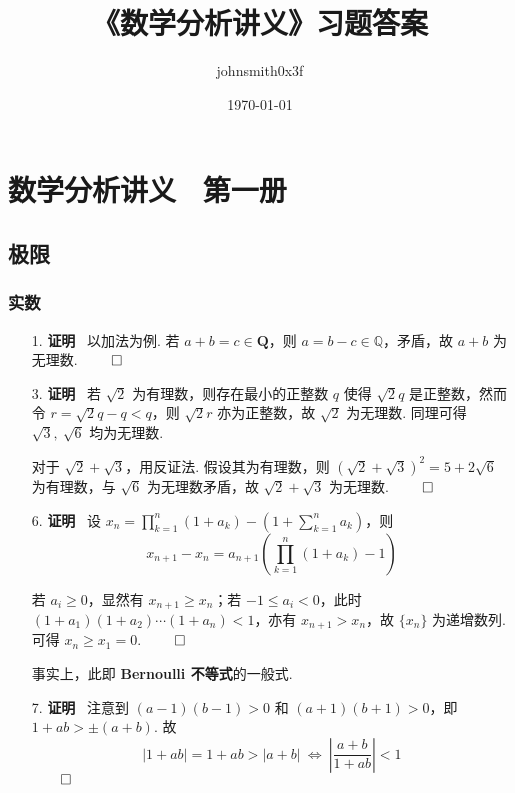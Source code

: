\documentclass[11pt,oneside,fontset=fandol]{ctexbook} %
\title{《数学分析讲义》习题答案}
\author{johnsmith0x3f}
\date{\today} %
\begin{document}
\maketitle

\newpage

\frontmatter

\tableofcontents

\newpage

\mainmatter

\part*{数学分析讲义 \ 第一册}

\thispagestyle{empty}

\newpage

\chapter{极限}

\section{实数}

\begin{enumerate}
    \item[1.]
    \textbf{证明} \ 以加法为例. 若 $a + b = c \in \mathbf Q$，则 $a = b - c \in \mathbb Q$，矛盾，故 $a + b$ 为无理数.
    $\hfill\qed$
    \item[3.]
    \textbf{证明} \ 若 $\sqrt 2$ 为有理数，则存在最小的正整数 $q$ 使得 $\sqrt 2 q$ 是正整数，然而令 $r = \sqrt 2 q - q < q$，则 $\sqrt 2 r$ 亦为正整数，故 $\sqrt 2$ 为无理数. 同理可得 $\sqrt 3,\ \sqrt 6$ 均为无理数.
    
    对于 $\sqrt 2 + \sqrt 3$，用反证法. 假设其为有理数，则 $(\sqrt 2 + \sqrt 3)^2 = 5 + 2 \sqrt 6$ 为有理数，与 $\sqrt 6$ 为无理数矛盾，故 $\sqrt 2 + \sqrt 3$ 为无理数.
    $\hfill\qed$
    \item[6.]
    \textbf{证明} \ 设 $x_n = \prod_{k=1}^n (1 + a_k) - (1 + \sum_{k=1}^n a_k)$，则
    \[
        x_{n+1} - x_n = a_{n+1} \left( \prod_{k=1}^n (1 + a_k) - 1 \right)
    \]
    
    若 $a_i \geqslant 0$，显然有 $x_{n+1} \geqslant x_n$；若 $-1 \leqslant a_i < 0$，此时 $(1+a_1)(1+a_2)\cdots(1+a_n) < 1$，亦有 $x_{n+1} > x_n$，故 $\{ x_n \}$ 为递增数列. 可得 $x_n \geqslant x_1 = 0$.
    $\hfill\qed$

    事实上，此即 \textbf{Bernoulli 不等式}的一般式.
    \item[7.]
    \textbf{证明} \ 注意到 $(a-1)(b-1) > 0$ 和 $(a+1)(b+1) > 0$，即 $1+ab > \pm(a+b)$. 故
    \[
        |1+ab| = 1+ab > |a+b| \ \Leftrightarrow \ \left| \frac{a+b}{1+ab} \right| < 1
    \]
    $\hfill\qed$
\end{enumerate}
\end{document}

